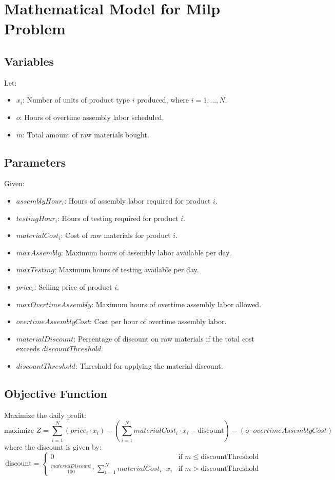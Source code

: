 \documentclass{article}
\begin{document}
\section*{Mathematical Model for Milp Problem}

\subsection*{Variables}
Let:
\begin{itemize}
    \item $x_i$: Number of units of product type $i$ produced, where $i = 1, \ldots, N$.
    \item $o$: Hours of overtime assembly labor scheduled.
    \item $m$: Total amount of raw materials bought.
\end{itemize}

\subsection*{Parameters}
Given:
\begin{itemize}
    \item $assemblyHour_i$: Hours of assembly labor required for product $i$.
    \item $testingHour_i$: Hours of testing required for product $i$.
    \item $materialCost_i$: Cost of raw materials for product $i$.
    \item $maxAssembly$: Maximum hours of assembly labor available per day.
    \item $maxTesting$: Maximum hours of testing available per day.
    \item $price_i$: Selling price of product $i$.
    \item $maxOvertimeAssembly$: Maximum hours of overtime assembly labor allowed.
    \item $overtimeAssemblyCost$: Cost per hour of overtime assembly labor.
    \item $materialDiscount$: Percentage of discount on raw materials if the total cost exceeds $discountThreshold$.
    \item $discountThreshold$: Threshold for applying the material discount.
\end{itemize}

\subsection*{Objective Function}
Maximize the daily profit:
\[
\text{maximize } Z = \sum_{i=1}^{N} \left( price_i \cdot x_i \right) - \left( \sum_{i=1}^{N} materialCost_i \cdot x_i - \text{discount} \right) - (o \cdot overtimeAssemblyCost)
\]
where the discount is given by:
\[
\text{discount} = 
\begin{cases} 
0 & \text{if } m \leq \text{discountThreshold} \\
\frac{materialDiscount}{100} \cdot \sum_{i=1}^{N} materialCost_i \cdot x_i & \text{if } m > \text{discountThreshold}
\end{cases}
\]
\end{document}

